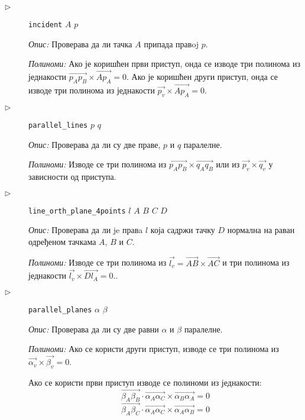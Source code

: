 \begin{description}
\item[$\triangleright$] {\tt incident} $A$ $p$

{\em Опис:} Проверава да ли тачка $A$ припада правoj $p$.

{\em Полиноми:} Ако је коришћен први приступ, онда се изводе три
полинома из једнакости $\overrightarrow{p_Ap_B} \times
\overrightarrow{Ap_A} = 0$. Ако је коришћен други приступ, онда се
изводе три полинома из једнакости $\overrightarrow{p_v} \times
\overrightarrow{Ap_A} = 0.$

\item[$\triangleright$] {\tt parallel\_lines} $p$ $q$

{\em Опис:} Проверава да ли су две праве, $p$ и $q$ паралелне.

{\em Полиноми:} Изводе се три полинома из $\overrightarrow{p_Ap_B}
\times \overrightarrow{q_Aq_B}$ или из $\overrightarrow{p_v} \times
\overrightarrow{q_v}$ у зависности од приступа.

\item[$\triangleright$] {\tt line\_orth\_plane\_4points} $l$ $A$ $B$ $C$ $D$

{\em Опис:} Проверава да ли je правa $l$ која садржи тачку $D$
нормална на раван одређеном тачкама $A$, $B$ и $C$.

{\em Полиноми:} Изводе се три полинома из $\overrightarrow{l_v} =
\overrightarrow{AB}\times \overrightarrow{AC}$ и три полинома из
једнакости $\overrightarrow{l_v} \times \overrightarrow{Dl_A} = 0.$.

\item[$\triangleright$] {\tt parallel\_planes} $\alpha$ $\beta$

{\em Опис:} Проверава да ли су две равни $\alpha$ и $\beta$ паралелне.

{\em Полиноми:} Ако се користи други приступ, изводе се три полинома из 
$\overrightarrow{\alpha_v} \times \overrightarrow{\beta_v} = 0.$


Ако се користи први приступ изводе се полиноми из једнакости:
$$\overrightarrow{\beta_A\beta_B}\cdot \overrightarrow{\alpha_A\alpha_C} \times \overrightarrow{\alpha_B\alpha_A} = 0$$
$$\overrightarrow{\beta_A\beta_C}\cdot \overrightarrow{\alpha_A\alpha_C} \times \overrightarrow{\alpha_A\alpha_B} = 0$$


\end{description}
